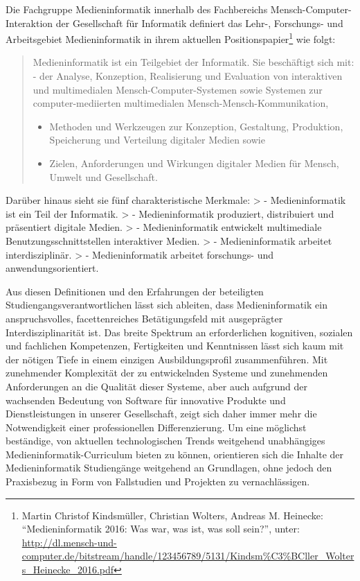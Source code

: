 Die Fachgruppe Medieninformatik innerhalb des Fachbereichs
Mensch-Computer-Interaktion der Gesellschaft für Informatik definiert
das Lehr-, Forschungs- und Arbeitsgebiet Medieninformatik in ihrem
aktuellen Positionspapier\footnote{Martin Christof Kindsmüller,
  Christian Wolters, Andreas M. Heinecke: ``Medieninformatik 2016: Was
  war, was ist, was soll sein?'', unter:
  \url{http://dl.mensch-und-computer.de/bitstream/handle/123456789/5131/Kindsm\%C3\%BCller_Wolters_Heinecke_2016.pdf}}
wie folgt:

\begin{quote}
Medieninformatik ist ein Teilgebiet der Informatik. Sie beschäftigt sich
mit: - der Analyse, Konzeption, Realisierung und Evaluation von
interaktiven und multimedialen Mensch-Computer-Systemen sowie Systemen
zur computer-mediierten multimedialen Mensch-Mensch-Kommunikation,

\begin{itemize}
\tightlist
\item
  Methoden und Werkzeugen zur Konzeption, Gestaltung, Produktion,
  Speicherung und Verteilung digitaler Medien sowie
\item
  Zielen, Anforderungen und Wirkungen digitaler Medien für Mensch,
  Umwelt und Gesellschaft.
\end{itemize}
\end{quote}

Darüber hinaus sieht sie fünf charakteristische Merkmale: \textgreater{}
- Medieninformatik ist ein Teil der Informatik. \textgreater{} -
Medieninformatik produziert, distribuiert und präsentiert digitale
Medien. \textgreater{} - Medieninformatik entwickelt multimediale
Benutzungsschnittstellen interaktiver Medien. \textgreater{} -
Medieninformatik arbeitet interdisziplinär. \textgreater{} -
Medieninformatik arbeitet forschungs- und anwendungsorientiert.

Aus diesen Definitionen und den Erfahrungen der beteiligten
Studiengangsverantwortlichen lässt sich ableiten, dass Medieninformatik
ein anspruchsvolles, facettenreiches Betätigungsfeld mit ausgeprägter
Interdisziplinarität ist. Das breite Spektrum an erforderlichen
kognitiven, sozialen und fachlichen Kompetenzen, Fertigkeiten und
Kenntnissen lässt sich kaum mit der nötigen Tiefe in einem einzigen
Ausbildungsprofil zusammenführen. Mit zunehmender Komplexität der zu
entwickelnden Systeme und zunehmenden Anforderungen an die Qualität
dieser Systeme, aber auch aufgrund der wachsenden Bedeutung von Software
für innovative Produkte und Dienstleistungen in unserer Gesellschaft,
zeigt sich daher immer mehr die Notwendigkeit einer professionellen
Differenzierung. Um eine möglichst beständige, von aktuellen
technologischen Trends weitgehend unabhängiges
Medieninformatik-Curriculum bieten zu können, orientieren sich die
Inhalte der Medieninformatik Studiengänge weitgehend an Grundlagen, ohne
jedoch den Praxisbezug in Form von Fallstudien und Projekten zu
vernachlässigen.


